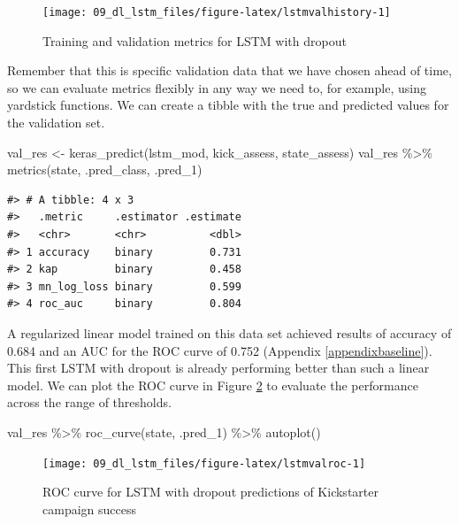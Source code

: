 \documentclass[
]{krantz}
\makeatletter
\newenvironment{Shaded}{\begin{snugshade}}{\end{snugshade}}
\newcommand{\FunctionTok}[1]{\textcolor[rgb]{0.00,0.00,0.00}{#1}}
\newcommand{\NormalTok}[1]{#1}
\newcommand{\OtherTok}[1]{\textcolor[rgb]{0.56,0.35,0.01}{#1}}
\newcommand{\SpecialCharTok}[1]{\textcolor[rgb]{0.00,0.00,0.00}{#1}}
\newenvironment{kframe}{%
\medskip{}
\setlength{\fboxsep}{.8em}
 \def\at@end@of@kframe{}%
 \ifinner\ifhmode%
  \def\at@end@of@kframe{\end{minipage}}%
  \begin{minipage}{\columnwidth}%
 \fi\fi%
 \def\FrameCommand##1{\hskip\@totalleftmargin \hskip-\fboxsep
 \colorbox{shadecolor}{##1}\hskip-\fboxsep
     \hskip-\linewidth \hskip-\@totalleftmargin \hskip\columnwidth}%
 \MakeFramed {\advance\hsize-\width
   \@totalleftmargin\z@ \linewidth\hsize
   \@setminipage}}%
 {\par\unskip\endMakeFramed%
 \at@end@of@kframe}
\renewenvironment{Shaded}{\begin{kframe}}{\end{kframe}}
\makeatother
\begin{document}
\begin{figure}

{\centering \texttt{[image: 09\_dl\_lstm\_files/figure-latex/lstmvalhistory-1]} 

}

\caption{Training and validation metrics for LSTM with dropout}\label{fig:lstmvalhistory}
\end{figure}

Remember that this is specific validation data that we have chosen ahead of time, so we can evaluate metrics flexibly in any way we need to, for example, using yardstick functions. We can create a tibble with the true and predicted values for the validation set.

\begin{Shaded}
\begin{Highlighting}[]
\NormalTok{val\_res }\OtherTok{\textless{}{-}} \FunctionTok{keras\_predict}\NormalTok{(lstm\_mod, kick\_assess, state\_assess)}
\NormalTok{val\_res }\SpecialCharTok{\%\textgreater{}\%} \FunctionTok{metrics}\NormalTok{(state, .pred\_class, .pred\_1)}
\end{Highlighting}
\end{Shaded}

\begin{verbatim}
#> # A tibble: 4 x 3
#>   .metric     .estimator .estimate
#>   <chr>       <chr>          <dbl>
#> 1 accuracy    binary         0.731
#> 2 kap         binary         0.458
#> 3 mn_log_loss binary         0.599
#> 4 roc_auc     binary         0.804
\end{verbatim}

A regularized linear model trained on this data set achieved results of accuracy of 0.684 and an AUC for the ROC curve of 0.752 (Appendix \ref{appendixbaseline}). This first LSTM with dropout is already performing better than such a linear model. We can plot the ROC curve in Figure \ref{fig:lstmvalroc} to evaluate the performance across the range of thresholds.

\begin{Shaded}
\begin{Highlighting}[]
\NormalTok{val\_res }\SpecialCharTok{\%\textgreater{}\%}
  \FunctionTok{roc\_curve}\NormalTok{(state, .pred\_1) }\SpecialCharTok{\%\textgreater{}\%}
  \FunctionTok{autoplot}\NormalTok{()}
\end{Highlighting}
\end{Shaded}

\begin{figure}

{\centering \texttt{[image: 09\_dl\_lstm\_files/figure-latex/lstmvalroc-1]} 

}

\caption{ROC curve for LSTM with dropout predictions of Kickstarter campaign success}\label{fig:lstmvalroc}
\end{figure}
\end{document}
